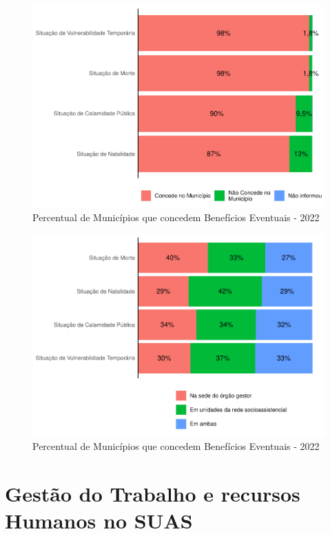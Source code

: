 \documentclass[
  brazilian]{report}
\begin{document}
\begin{figure}
\includegraphics{Censo-SUAS-2022_files/figure-latex/be-munic-1} \caption[Percentual de Municípios que concedem Benefícios Eventuais - 2022]{Percentual de Municípios que concedem Benefícios Eventuais - 2022}\label{fig:be-munic}
\end{figure}

\begin{figure}
\includegraphics{Censo-SUAS-2022_files/figure-latex/be-local-1} \caption[Percentual de Municípios que concedem Benefícios Eventuais - 2022]{Percentual de Municípios que concedem Benefícios Eventuais - 2022}\label{fig:be-local}
\end{figure}

\hypertarget{gestuxe3o-do-trabalho-e-recursos-humanos-no-suas}{%
\section{Gestão do Trabalho e recursos Humanos no
SUAS}\label{gestuxe3o-do-trabalho-e-recursos-humanos-no-suas}}
\end{document}
